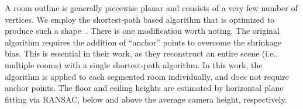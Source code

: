 A room outline is generally piecewise planar and consists of a very few
number of vertices. We employ the shortest-path based algorithm that is
optimized to produce such a shape~\cite{Cabral2014}. There is one
modification worth noting. The original algorithm requires the addition
of ``anchor'' points to overcome the shrinkage bias.
This is essential in their work, as they reconstruct an entire scene
(i.e., multiple rooms) with a single shortest-path algorithm.
%
In this work, the algorithm is applied to each segmented
room individually, and does not require anchor points.
%
The floor and ceiling heights are estimated by horizontal plane fitting
via RANSAC, 
below and above the average camera height, respectively.








